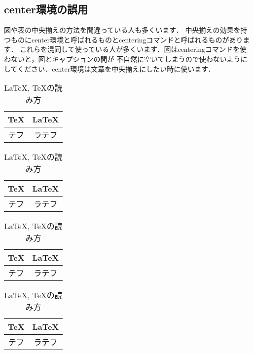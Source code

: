\documentclass[dvipdfmx,uplatex]{jsarticle}
\begin{document}
{\subsection{center環境の誤用}
図や表の中央揃えの方法を間違っている人も多くいます．
中央揃えの効果を持つものにcenter環境と呼ばれるものとcenteringコマンドと呼ばれるものがあります．
これらを混同して使っている人が多くいます．図はcenteringコマンドを使わないと，図とキャプションの間が
不自然に空いてしまうので使わないようにしてください．center環境は文章を中央揃えにしたい時に使います．
\begin{tcolorbox}[title=中央揃え]
\begin{excode}
  \begin{table}[h]
    \caption{\LaTeX , \TeX の読み方}
    \begin{center}
      \begin{tabular}{c|c}
        \TeX & \LaTeX \\ \hline
        テフ & ラテフ
      \end{tabular}
    \end{center}
  \end{table}
  \begin{table}[h]
    \caption{\LaTeX , \TeX の読み方}
    \centering
    \begin{tabular}{c|c}
      \TeX & \LaTeX \\ \hline
      テフ & ラテフ
    \end{tabular}
  \end{table}
\end{excode}
\end{tcolorbox}

\begin{table}[h]
\centering
  \begin{minipage}{0.45\columnwidth}
    \caption{\LaTeX , \TeX の読み方}
    \begin{center}
      \begin{tabular}{c|c}
        \TeX & \LaTeX \\ \hline
        テフ & ラテフ
      \end{tabular}
    \end{center}
  \end{minipage}
  \begin{minipage}{0.45\columnwidth}
    \caption{\LaTeX , \TeX の読み方}
    \centering
    \begin{tabular}{c|c}
      \TeX & \LaTeX \\ \hline
      テフ & ラテフ
    \end{tabular}
\end{minipage}
\end{table}

}
\end{document}
